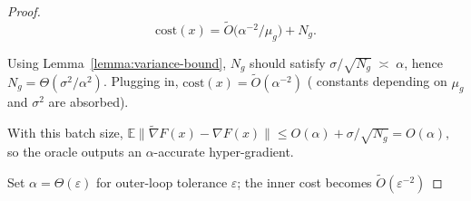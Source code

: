 \documentclass[letterpaper]{article} %
\newcommand{\EE}{\mathbb{E}}
\newcommand{\1}{\mathbf{1}}
\begin{document}
\begin{proof}
\[
\text{cost}(x)=\tilde O\!\bigl(\alpha^{-2}/\mu_{g}\bigr)+N_{g}.
\]

Using Lemma~\ref{lemma:variance-bound},
$N_{g}$ should satisfy
$\sigma/\sqrt{N_{g}}\;\asymp\;\alpha$,
hence
$N_{g}=\Theta(\sigma^{2}/\alpha^{2})$.                       
Plugging in,
\(\text{cost}(x)=\tilde O(\alpha^{-2})\)
( constants depending on $\mu_{g}$ and $\sigma^{2}$ are absorbed).

With this batch size,
\(
\EE\bigl\|\tilde\nabla F(x)-\nabla F(x)\bigr\|
\le
O(\alpha)+\sigma/\sqrt{N_{g}}
=O(\alpha),
\)
so the oracle outputs an $\alpha$-accurate hyper-gradient.

Set $\alpha=\Theta(\varepsilon)$ for outer-loop tolerance
$\varepsilon$; the inner cost becomes
$\tilde O(\varepsilon^{-2})$
\end{proof}
\end{document}
